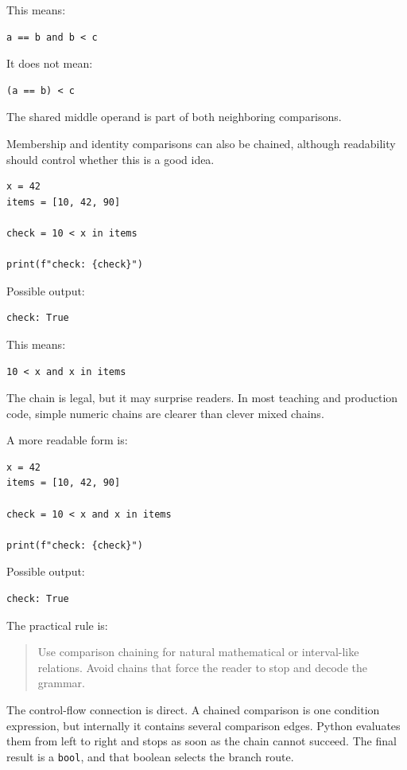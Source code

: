 This means:

\begin{verbatim}
a == b and b < c
\end{verbatim}

It does not mean:

\begin{verbatim}
(a == b) < c
\end{verbatim}

The shared middle operand is part of both neighboring comparisons.

Membership and identity comparisons can also be chained, although readability should control whether this is a good idea.

\begin{verbatim}
x = 42
items = [10, 42, 90]

check = 10 < x in items

print(f"check: {check}")
\end{verbatim}

Possible output:

\begin{verbatim}
check: True
\end{verbatim}

This means:

\begin{verbatim}
10 < x and x in items
\end{verbatim}

The chain is legal, but it may surprise readers. In most teaching and production code, simple numeric chains are clearer than clever mixed chains.

A more readable form is:

\begin{verbatim}
x = 42
items = [10, 42, 90]

check = 10 < x and x in items

print(f"check: {check}")
\end{verbatim}

Possible output:

\begin{verbatim}
check: True
\end{verbatim}

The practical rule is:

\begin{quote}
Use comparison chaining for natural mathematical or interval-like relations. Avoid chains that force the reader to stop and decode the grammar.
\end{quote}

The control-flow connection is direct. A chained comparison is one condition expression, but internally it contains several comparison edges. Python evaluates them from left to right and stops as soon as the chain cannot succeed. The final result is a \texttt{bool}, and that boolean selects the branch route.